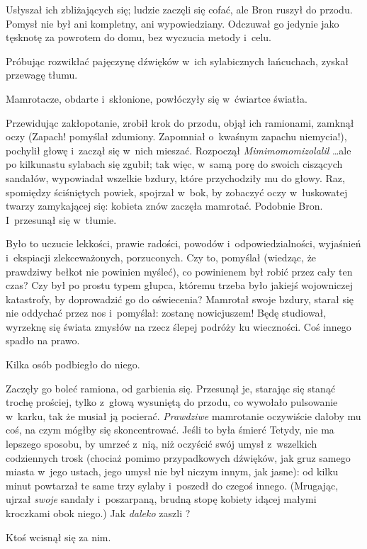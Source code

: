 \documentclass[oneside,polish,11pt,rmheadings]{mwbk}
\begin{document}
Usłyszał ich zbliżających się; ludzie zaczęli się cofać, ale Bron ruszył do przodu. Pomysł nie był ani kompletny, ani wypowiedziany. Odczuwał go jedynie jako tęsknotę za powrotem do domu, bez wyczucia metody i~celu. 

Próbując rozwikłać pajęczynę dźwięków w~ich sylabicznych łańcuchach, zyskał przewagę tłumu. 

Mamrotacze, obdarte i~skłonione, powłóczyły się w~ćwiartce światła. 

Przewidując zakłopotanie, zrobił krok do przodu, objął ich ramionami, zamknął oczy (Zapach! pomyślał zdumiony. Zapomniał o~kwaśnym zapachu niemycia!), pochylił głowę i~zaczął się w~nich mieszać. Rozpoczął \textit{Mimimomomizolalil }  \ldots  ale po kilkunastu sylabach się zgubił; tak więc, w~samą porę do swoich ciszących sandałów, wypowiadał wszelkie bzdury, które przychodziły mu do głowy. Raz, spomiędzy ściśniętych powiek, spojrzał w~bok, by zobaczyć oczy w~łuskowatej twarzy zamykającej się: kobieta znów zaczęła mamrotać. Podobnie Bron. I~przesunął się w~tłumie. 

Było to uczucie lekkości, prawie radości, powodów i~odpowiedzialności, wyjaśnień i~ekspiacji zlekceważonych, porzuconych. Czy to, pomyślał (wiedząc, że prawdziwy bełkot nie powinien myśleć), co powinienem był robić przez cały ten czas? Czy był po prostu typem głupca, któremu trzeba było jakiejś wojowniczej katastrofy, by doprowadzić go do oświecenia? Mamrotał swoje bzdury, starał się nie oddychać przez nos i~pomyślał: zostanę nowicjuszem! Będę studiował, wyrzeknę się świata zmysłów na rzecz ślepej podróży ku wieczności. Coś innego spadło na prawo. 

Kilka osób podbiegło do niego. 

Zaczęły go boleć ramiona, od garbienia się. Przesunął je, starając się stanąć trochę prościej, tylko z~głową wysuniętą do przodu, co wywołało pulsowanie w~karku, tak że musiał ją pocierać. \textit{Prawdziwe }mamrotanie oczywiście dałoby mu coś, na czym mógłby się skoncentrować. Jeśli to była śmierć Tetydy, nie ma lepszego sposobu, by umrzeć z~nią, niż oczyścić swój umysł z~wszelkich codziennych trosk (chociaż pomimo przypadkowych dźwięków, jak gruz samego miasta w~jego ustach, jego umysł nie był niczym innym, jak jasne): od kilku minut powtarzał te same trzy sylaby i~poszedł do czegoś innego. (Mrugając, ujrzał \textit{swoje }sandały i~poszarpaną, brudną stopę kobiety idącej małymi kroczkami obok niego.) Jak \textit{daleko }zaszli ? 

Ktoś wcisnął się za nim. 
\end{document}
